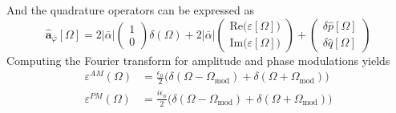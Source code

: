 And the quadrature operators can be expressed as
\begin{equation}
\hat{\mathbf a}_{\bar{\varphi}} [\Omega] =2|\bar{\alpha}| \begin{pmatrix}
  1 \\ 0 
\end{pmatrix}\delta(\Omega) + 2|\bar{\alpha}|\begin{pmatrix}
  \mathrm{Re}\big(\varepsilon[\Omega] \big) \\
  \mathrm{Im}\big(\varepsilon[\Omega] \big)
\end{pmatrix}
+ \begin{pmatrix}
  \delta \hat{p}[\Omega] \\
  \delta \hat{q}[\Omega]
\end{pmatrix}
\end{equation}
Computing the Fourier transform for amplitude and phase modulations yields
\begin{equation}
  \begin{split}
    \varepsilon^{AM}(\Omega) & = \frac{\epsilon_a}{2} \Big(\delta(\Omega - \Omega_{\text{mod}}) +\delta(\Omega + \Omega_{\text{mod}}) \Big)\\
    \varepsilon^{PM}(\Omega) & = \frac{i\epsilon_\phi}{2} \Big(\delta(\Omega - \Omega_{\text{mod}}) + \delta(\Omega + \Omega_{\text{mod}})\Big)
  \end{split}
\end{equation}

